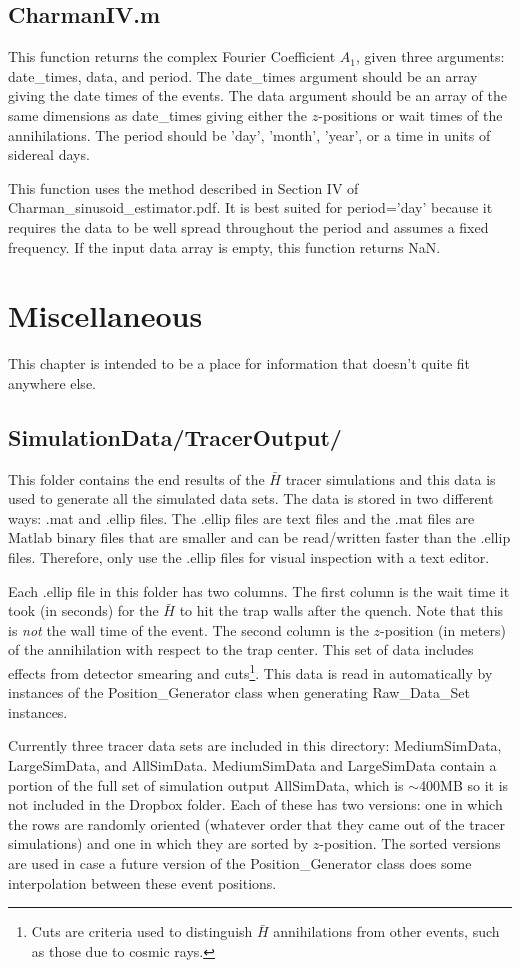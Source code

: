 \documentclass[12pt]{report}
\begin{document}
\section{CharmanIV.m}
This function returns the complex Fourier Coefficient $A_1$, given three arguments: date\_times, data, and period.  The date\_times argument should be an array giving the date times of the events.  The data argument should be an array of the same dimensions as date\_times giving either the $z$-positions or wait times of the annihilations.  The period should be 'day', 'month', 'year', or a time in units of sidereal days.

This function uses the method described in Section IV of Charman\_sinusoid\_estimator.pdf.  It  is best suited for period='day' because it requires the data to be well spread throughout the period and assumes a fixed frequency.  If the input data array is empty, this function returns NaN.





\chapter{Miscellaneous}
This chapter is intended to be a place for information that doesn't quite fit anywhere else.

\section{SimulationData/TracerOutput/}
This folder contains the end results of the $\bar{H}$ tracer simulations and this data is used to generate all the simulated data sets.  The data is stored in two different ways: .mat and .ellip files.  The .ellip files are text files and the .mat files are Matlab binary files that are smaller and can be read/written faster than the .ellip files.  Therefore, only use the .ellip files for visual inspection with a text editor.

Each .ellip file in this folder has two columns.  The first  column is the wait time it took (in seconds) for the $\bar{H}$ to hit the trap walls after the quench.  Note that this is \textit{not} the wall time of the event.  The second column is the $z$-position (in meters) of the annihilation with respect to the trap center.  This set of data includes effects from detector smearing and cuts\footnote{Cuts are criteria used to distinguish $\bar{H}$ annihilations from other events, such as those due to cosmic rays.}.  This data is read in automatically by instances of the Position\_Generator class when generating Raw\_Data\_Set instances.

Currently three tracer data sets are included in this directory: MediumSimData, LargeSimData, and AllSimData.  MediumSimData and LargeSimData contain a portion of the full set of simulation output AllSimData, which is ${\sim}$400MB so it is not included in the Dropbox folder.  Each of these has two versions: one in which the rows are randomly oriented (whatever order that they came out of the tracer simulations) and one in which they are sorted by $z$-position.  The sorted versions are used in case a future version of the Position\_Generator class does some interpolation between these event positions.
\end{document}
